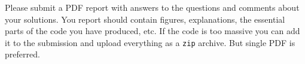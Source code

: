 \documentclass[a4paper,11pt]{article}
\begin{document}
\ \\
\ \\
\ \\
\ \\
\ \\
Please submit a PDF report with answers to the questions and comments about your solutions. You report should contain figures, explanations, the essential parts of the code you have produced, etc. If the code is too massive you can add it to the submission and upload everything as a \texttt{zip} archive. But single PDF is preferred.
\end{document}
